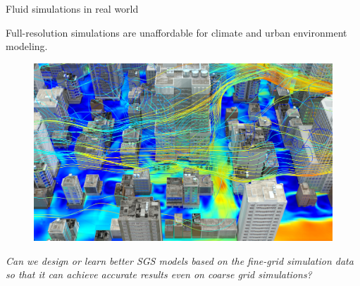 \documentclass[aspectratio=169]{beamer}
\begin{document}




\begin{frame}{Fluid simulations in real world}

	Full-resolution simulations are unaffordable for climate and
	urban environment modeling.
	\begin{figure}[ht]
		\centering
		\includegraphics[width=.6\linewidth]{fig/urban_environment.jpeg}
	\end{figure}

	\textit{Can we {\color{red}design or learn better SGS models} based on
 the fine-grid simulation data
 so that it can achieve accurate results even {\color{red}on coarse grid 
 simulations?}}
\end{frame}
\end{document}
